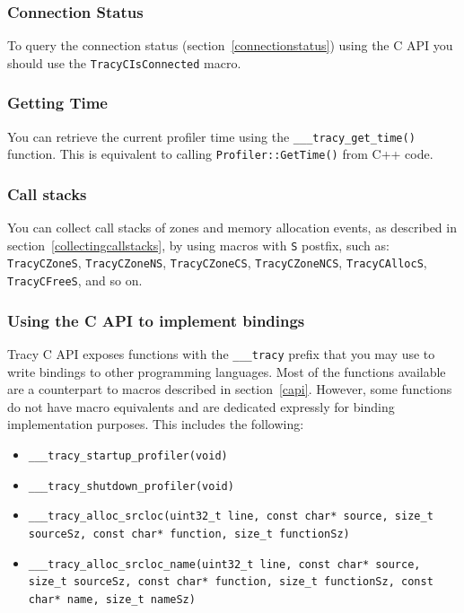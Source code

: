 \documentclass[hidelinks,titlepage,a4paper,twoside]{article}
\begin{document}
\subsubsection{Connection Status}

To query the connection status (section~\ref{connectionstatus}) using the C API you should use the \texttt{TracyCIsConnected} macro.

\subsubsection{Getting Time}

You can retrieve the current profiler time using the \texttt{\_\_\_tracy\_get\_time()} function. This is equivalent to calling \texttt{Profiler::GetTime()} from C++ code.

\subsubsection{Call stacks}

You can collect call stacks of zones and memory allocation events, as described in section~\ref{collectingcallstacks}, by using macros with \texttt{S} postfix, such as: \texttt{TracyCZoneS}, \texttt{TracyCZoneNS}, \texttt{TracyCZoneCS}, \texttt{TracyCZoneNCS}, \texttt{TracyCAllocS}, \texttt{TracyCFreeS}, and so on.

\subsubsection{Using the C API to implement bindings}
\label{capibindings}

Tracy C API exposes functions with the \texttt{\_\_\_tracy} prefix that you may use to write bindings to other programming languages. Most of the functions available are a counterpart to macros described in section~\ref{capi}. However, some functions do not have macro equivalents and are dedicated expressly for binding implementation purposes. This includes the following:

\begin{itemize}
\item \texttt{\_\_\_tracy\_startup\_profiler(void)}
\item \texttt{\_\_\_tracy\_shutdown\_profiler(void)}
\item \texttt{\_\_\_tracy\_alloc\_srcloc(uint32\_t line, const char* source, size\_t sourceSz, const char* function, size\_t functionSz)}
\item \texttt{\_\_\_tracy\_alloc\_srcloc\_name(uint32\_t line, const char* source, size\_t sourceSz, const char* function, size\_t functionSz, const char* name, size\_t nameSz)}
\end{itemize}
\end{document}
